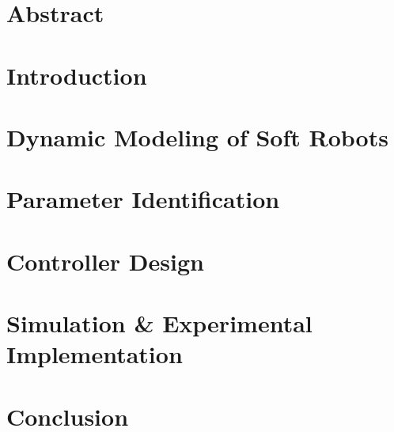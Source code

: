 \documentclass[11pt,twoside]{report}
\begin{document}

\thispagestyle{empty}



\chapter*{Abstract}

\cleardoublepage

\tableofcontents

\cleardoublepage

\cleardoublepage







\chapter{Introduction}

\cleardoublepage

\chapter{Dynamic Modeling of Soft Robots}

\cleardoublepage

\chapter{Parameter Identification}

\cleardoublepage


\chapter{Controller Design}

\cleardoublepage


\chapter{Simulation \& Experimental Implementation}

\cleardoublepage

\chapter{Conclusion}
%

%
\end{document}
